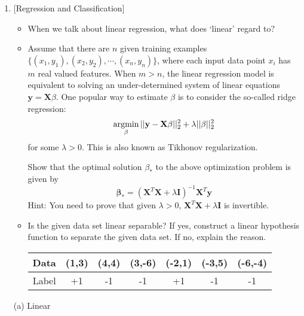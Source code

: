 \documentclass[10pt]{article}
\begin{document}
\begin{enumerate}[1.]
(a) 



(b) 



(c)










	      \newpage

	\item {} [Regression and Classification]
	      \begin{itemize}
			\item[(a)] When we talk about linear regression, what does `linear' regard to? 
			\item[(b)] Assume that there are $n$ given training examples $\{(x_1, y_1), (x_2, y_2), \cdots, (x_n, y_n)\}$,
			where each input data point $x_i$ has $m$ real valued features. When $m > n$, the linear regression model
			is equivalent to solving an under-determined system of linear equations $\mathbf{y} = \mathbf{X}\beta$. One popular way to
			estimate $\beta$ is to consider the so-called ridge regression:
			\[\mathop{\rm argmin}_{\beta} ||\mathbf{y}-\mathbf{X}\mathbf{\beta}||_2^2 + \lambda||\beta||_2^2\]
			for some $\lambda > 0$. This is also known as Tikhonov regularization.
			
			Show that the optimal solution $\beta_*$ to the above optimization problem is given by
			\[\mathbf{\beta}_* = (\mathbf{X}^T\mathbf{X} + \lambda \mathbf{I})^{-1}\mathbf{X}^T\mathbf{y}\]
			Hint: You need to prove that given $\lambda>0$, $\mathbf{X}^T\mathbf{X} + \lambda \mathbf{I}$ is invertible. 
			\item[(c)] Is the given data set linear separable? If yes, construct a linear hypothesis function to separate the given data set. If no, explain the reason. 
			
			\begin{table}[h]
				\centering
				\begin{tabular}{c|cccccc}
					Data & (1,3) & (4,4) & (3,-6) & (-2,1) & (-3,5) & (-6,-4) \\ \hline
					Label & +1 & -1 & -1 & +1 & -1 & -1
				\end{tabular}
				\label{tab:my_label}
			\end{table}
	      \end{itemize}
      	  
(a) Linear











\end{enumerate}
\end{document}
